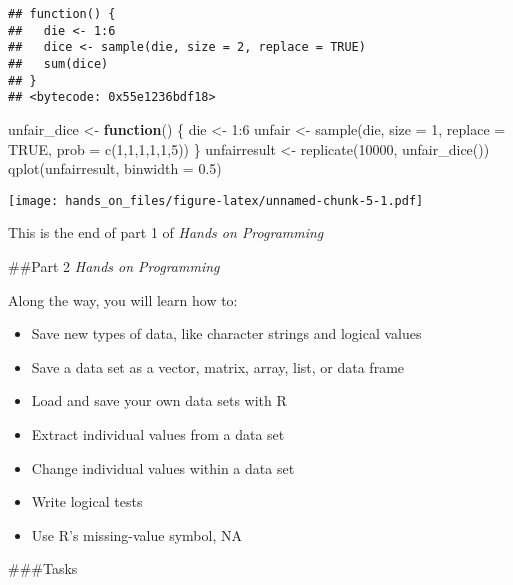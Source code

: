 \documentclass[
]{article}
\newenvironment{Shaded}{\begin{snugshade}}{\end{snugshade}}
\newcommand{\AttributeTok}[1]{\textcolor[rgb]{0.77,0.63,0.00}{#1}}
\newcommand{\ConstantTok}[1]{\textcolor[rgb]{0.00,0.00,0.00}{#1}}
\newcommand{\ControlFlowTok}[1]{\textcolor[rgb]{0.13,0.29,0.53}{\textbf{#1}}}
\newcommand{\DecValTok}[1]{\textcolor[rgb]{0.00,0.00,0.81}{#1}}
\newcommand{\FloatTok}[1]{\textcolor[rgb]{0.00,0.00,0.81}{#1}}
\newcommand{\FunctionTok}[1]{\textcolor[rgb]{0.00,0.00,0.00}{#1}}
\newcommand{\NormalTok}[1]{#1}
\newcommand{\OtherTok}[1]{\textcolor[rgb]{0.56,0.35,0.01}{#1}}
\newcommand{\SpecialCharTok}[1]{\textcolor[rgb]{0.00,0.00,0.00}{#1}}
\providecommand{\tightlist}{%
  \setlength{\itemsep}{0pt}\setlength{\parskip}{0pt}}
\begin{document}
\begin{verbatim}
## function() {
##   die <- 1:6
##   dice <- sample(die, size = 2, replace = TRUE)
##   sum(dice)
## }
## <bytecode: 0x55e1236bdf18>
\end{verbatim}

\begin{Shaded}
\begin{Highlighting}[]
\NormalTok{unfair\_dice }\OtherTok{\textless{}{-}} \ControlFlowTok{function}\NormalTok{() \{}
\NormalTok{  die }\OtherTok{\textless{}{-}} \DecValTok{1}\SpecialCharTok{:}\DecValTok{6}
\NormalTok{  unfair }\OtherTok{\textless{}{-}} \FunctionTok{sample}\NormalTok{(die, }\AttributeTok{size =} \DecValTok{1}\NormalTok{, }\AttributeTok{replace =} \ConstantTok{TRUE}\NormalTok{, }\AttributeTok{prob =} \FunctionTok{c}\NormalTok{(}\DecValTok{1}\NormalTok{,}\DecValTok{1}\NormalTok{,}\DecValTok{1}\NormalTok{,}\DecValTok{1}\NormalTok{,}\DecValTok{1}\NormalTok{,}\DecValTok{5}\NormalTok{))}
\NormalTok{\}}
\NormalTok{unfairresult }\OtherTok{\textless{}{-}} \FunctionTok{replicate}\NormalTok{(}\DecValTok{10000}\NormalTok{, }\FunctionTok{unfair\_dice}\NormalTok{())}
\FunctionTok{qplot}\NormalTok{(unfairresult, }\AttributeTok{binwidth =} \FloatTok{0.5}\NormalTok{)}
\end{Highlighting}
\end{Shaded}

\texttt{[image: hands\_on\_files/figure-latex/unnamed-chunk-5-1.pdf]}

This is the end of part 1 of \emph{Hands on Programming}

\#\#Part 2 \emph{Hands on Programming}

Along the way, you will learn how to:

\begin{itemize}
\tightlist
\item
  Save new types of data, like character strings and logical values
\item
  Save a data set as a vector, matrix, array, list, or data frame
\item
  Load and save your own data sets with R
\item
  Extract individual values from a data set
\item
  Change individual values within a data set
\item
  Write logical tests
\item
  Use R's missing-value symbol, NA
\end{itemize}

\#\#\#Tasks
\end{document}
